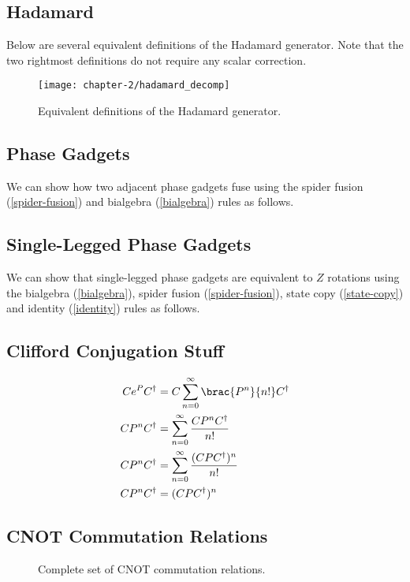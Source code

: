 \subsection{Hadamard}%
\label{appendix-hadamard}

Below are several equivalent definitions of the Hadamard generator. Note that the two rightmost definitions do not require any scalar correction.

\begin{figure}[H]
\centering
    \centering
    \texttt{[image: chapter-2/hadamard\_decomp]}
    \caption{Equivalent definitions of the Hadamard generator.}
\end{figure}


\subsection{Phase Gadgets}%
\label{appendix-phase-gadget-fusion}

We can show how two adjacent phase gadgets fuse using the spider fusion (\ref{spider-fusion}) and bialgebra (\ref{bialgebra}) rules as follows.

%


\subsection{Single-Legged Phase Gadgets}%
\label{appendix-phase-gadget-single-leg}

We can show that single-legged phase gadgets are equivalent to $Z$ rotations using the bialgebra (\ref{bialgebra}), spider fusion (\ref{spider-fusion}), state copy (\ref{state-copy}) and identity (\ref{identity}) rules as follows.



\subsection{Clifford Conjugation Stuff}%
\label{conjugation}

\begin{align*}
    Ce^PC^\dagger &= C \sum_{n=0}^\infty \brac{P^n}{n!} C^\dagger \\
    CP^nC^\dagger &= \sum_{n=0}^\infty \frac{C P^n C^\dagger}{n!} \\
    CP^nC^\dagger &= \sum_{n=0}^\infty \frac{(C P C^\dagger)^n}{n!} \\
    CP^nC^\dagger &= (CPC^\dagger)^n
\end{align*}


\subsection{CNOT Commutation Relations}

\begin{figure}[H]
    \centering
    \caption{Complete set of CNOT commutation relations.}
    \label{cnot_commutations}
\end{figure}
